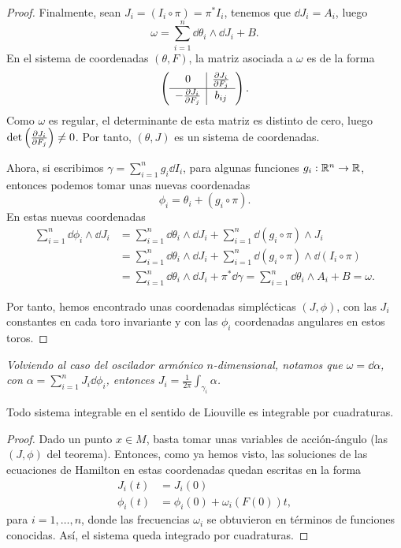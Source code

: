 \begin{proof}
Finalmente, sean $J_i=(I_i \circ \pi)=\pi^* I_i$, tenemos que $\dd J_i = A_i$, luego
\[
  \omega = \sum_{i=1}^n \dd \theta_i \wedge \dd J_i + B.
\]
En el sistema de coordenadas $(\theta,F)$, la matriz asociada a $\omega$ es de la forma
\[
\left(
\begin{array}{c|c}
  0 & \frac{\partial J_i}{\partial F_j} \\
  \hline 
  -\frac{\partial J_i}{\partial F_j} & b_{ij}
\end{array}\right).
\]
Como $\omega$ es regular, el determinante de esta matriz es distinto de cero, luego $\det\left(\frac{\partial J_i}{\partial F_j}\right)\neq 0$. Por tanto, $(\theta,J)$ es un sistema de coordenadas.

Ahora, si escribimos $\gamma= \sum_{i=1}^n g_i \dd I_i$, para algunas funciones $g_i:\mathbb{R}^n \rightarrow \mathbb{R}$, entonces podemos tomar unas nuevas coordenadas 
\[
  \phi_i= \theta_i + (g_i \circ \pi).
\]
En estas nuevas coordenadas
\[
\begin{split}
  \sum_{i=1}^n \dd \phi_i \wedge \dd J_i & = \sum_{i=1}^n \dd \theta_i \wedge \dd J_i + \sum_{i=1}^n \dd(g_i \circ \pi) \wedge J_i \\
   & =\sum_{i=1}^n \dd \theta_i \wedge \dd J_i + \sum_{i=1}^n \dd(g_i \circ \pi) \wedge \dd (I_i \circ \pi) \\
   & =\sum_{i=1}^n \dd \theta_i \wedge \dd J_i + \pi^* \dd \gamma = \sum_{i=1}^n \dd \theta_i \wedge A_i + B = \omega.
\end{split}
\]

Por tanto, hemos encontrado unas coordenadas simplécticas $(J,\phi)$, con las $J_i$ constantes en cada toro invariante y con las $\phi_i$ coordenadas angulares en estos toros.
\end{proof}

\begin{obs}
  \em
  Volviendo al caso del oscilador armónico $n$-dimensional, notamos que $\omega=\dd \alpha$, con $\alpha=\sum_{i=1}^n J_i \dd \phi_i$, entonces $J_i=\frac{1}{2\pi}\int_{\gamma_i}\alpha$.
\end{obs}

\begin{corol}
  Todo sistema integrable en el sentido de Liouville es integrable por cuadraturas.
\end{corol}

\begin{proof}
  Dado un punto $x \in M$, basta tomar unas variables de acción-ángulo (las $(J,\phi)$ del teorema). Entonces, como ya hemos visto, las soluciones de las ecuaciones de Hamilton en estas coordenadas quedan escritas en la forma
  \begin{align*}
    J_i(t) & = J_i (0) \\
    \phi_i(t) & = \phi_i(0) + \omega_i(F(0))t,
  \end{align*}
  para $i=1,\dots,n$, donde las frecuencias $\omega_i$ se obtuvieron en términos de funciones conocidas. Así, el sistema queda integrado por cuadraturas.
\end{proof}



